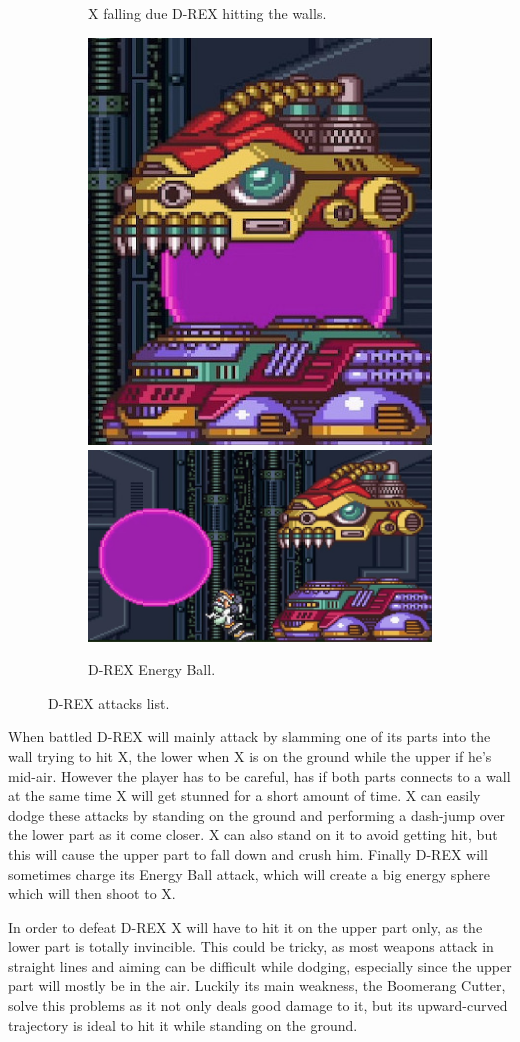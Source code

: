\begin{figure}[htp]
\begin{subfigure}[t]{0.40\linewidth}
		\caption{X falling due D-REX hitting the walls.}
	\end{subfigure}
	\begin{subfigure}{\linewidth}
		\centering
		\includegraphics[width=0.26\linewidth]{figures/X1/Sigma_stages/Drex_laser_1.jpg}
		\includegraphics[width=0.55\linewidth]{figures/X1/Sigma_stages/Drex_laser_2.jpg}
		\caption{D-REX Energy Ball.}
	\end{subfigure}
	\caption{D-REX attacks list.}
\end{figure} 

When battled D-REX will mainly attack by slamming one of its parts into the wall trying to hit X, the lower when X is on the ground while the upper if he's mid-air. However the player has to be careful, has if both parts connects to a wall at the same time X will get stunned for a short amount of time. X can easily dodge these attacks by standing on the ground and performing a dash-jump over the lower part as it come closer. X can also stand on it to avoid getting hit, but this will cause the upper part to fall down and crush him. Finally D-REX will sometimes charge its Energy Ball attack, which will create a big energy sphere which will then shoot to X.

In order to defeat D-REX X will have to hit it on the upper part only, as the lower part is totally invincible. This could be tricky, as most weapons attack in straight lines and aiming can be difficult while dodging, especially since the upper part will mostly be in the air. Luckily its main weakness, the Boomerang Cutter, solve this problems as it not only deals good damage to it, but its upward-curved trajectory is ideal to hit it while standing on the ground.

